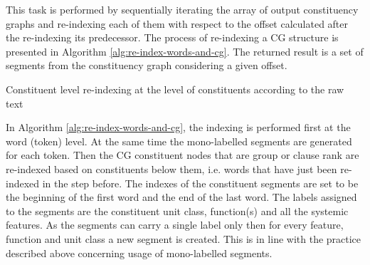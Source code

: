     This task is performed by sequentially iterating the array of output constituency graphs and re-indexing each of them with respect to the offset calculated after the re-indexing its predecessor. The process of re-indexing a CG structure is presented in Algorithm \ref{alg:re-index-words-and-cg}. The returned result is a set of segments from the constituency graph considering a given offset.

    \begin{algorithm}[!ht]
        \caption{Constituent level re-indexing at the level of constituents according to the raw text}
        \label{alg:re-index-words-and-cg}
    \end{algorithm}

    In Algorithm \ref{alg:re-index-words-and-cg}, the indexing is performed first at the word (token) level. At the same time the mono-labelled segments are generated for each token. Then the CG constituent nodes that are group or clause rank are re-indexed based on constituents below them, i.e. words that have just been re-indexed in the step before. The indexes of the constituent segments are set to be the beginning of the first word and the end of the last word. The labels assigned to the segments are the constituent unit class, function(s) and all the systemic features. As the segments can carry a single label only then for every feature, function and unit class a new segment is created. This is in line with the practice described above concerning usage of mono-labelled segments.

